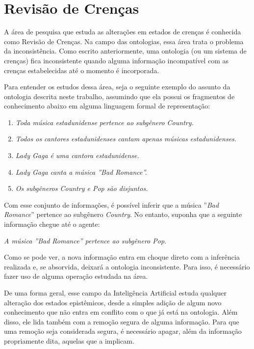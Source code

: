 \chapter{Revisão de Crenças}
\label{chap:revisao}

\lettrine{A}{} área de pesquisa que estuda as alterações em estados de crenças é conhecida como Revisão de Crenças. Na campo das ontologias, essa área trata o problema da inconsistência. Como escrito anteriormente, uma ontologia (ou um sistema de crenças) fica inconsistente quando alguma informação incompatível com as crenças estabelecidas até o momento é incorporada.

Para entender os estudos dessa área, seja o seguinte exemplo do assunto da ontologia descrita neste trabalho, assumindo que ela possui os fragmentos de conhecimento abaixo em alguma linguagem formal de representação:

\begin{enumerate}
	\item \textit{Toda música estadunidense pertence ao subgênero \textit{Country}.}
	\item \textit{Todos os cantores estadunidenses cantam apenas músicas estadunidenses.}
	\item \textit{Lady Gaga é uma cantora estadunidense.}
	\item \textit{Lady Gaga canta a música ''\textit{Bad Romance}''.}
	\item \textit{Os subgêneros Country e Pop são disjuntos.}
\end{enumerate}

Com esse conjunto de informações, é possível inferir que a música ''\textit{Bad Romance}'' pertence ao subgênero \textit{Country}. No entanto, suponha que a seguinte informação chegue até o agente:

\begin{center}
	\textit{A música ''\textit{Bad Romance}'' pertence ao subgênero Pop.}
\end{center}

Como se pode ver, a nova informação entra em choque direto com a inferência realizada e, se absorvida, deixará a ontologia inconsistente. Para isso, é necessário fazer uso de alguma operação estudada na área.

De uma forma geral, esse campo da Inteligência Artificial estuda qualquer alteração dos estados epistêmicos, desde a simples adição de algum novo conhecimento que não entra em conflito com o que já está na ontologia. Além disso, ele lida também com a remoção segura de alguma informação. Para que uma remoção seja considerada segura, é necessário apagar, além da informação propriamente dita, aquelas que a implicam. 

